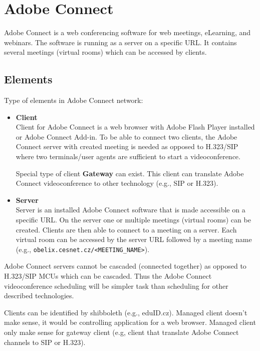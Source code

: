 \documentclass[a4paper]{report}
\begin{document}
\section{Adobe Connect}

Adobe Connect is a web conferencing software for web meetings, eLearning, and webinars. The software is running as a server on a specific URL. It contains several meetings (virtual rooms) which can be accessed by clients.

\subsection{Elements}

Type of elements in Adobe Connect network:

\begin{itemize}
\item \textbf{Client} \\
Client for Adobe Connect is a web browser with Adobe Flash Player installed or Adobe Connect Add-in. To be able to connect two clients, the Adobe Connect server with created meeting is needed as opposed to H.323/SIP  where two terminals/user agents are sufficient to start a videoconference.

Special type of client \textbf{Gateway} can exist. This client can translate Adobe Connect videoconference to other technology (e.g., SIP or H.323).

\item \textbf{Server} \\
Server is an installed Adobe Connect software that is made accessible on a specific URL. On the server one or multiple meetings (virtual rooms) can be created. Clients are then able to connect to a meeting on a server. Each virtual room can be accessed by the server URL followed by a meeting name (e.g., \verb|obelix.cesnet.cz/<MEETING_NAME>|).
\end{itemize}

Adobe Connect servers cannot be cascaded (connected together) as opposed to H.323/SIP MCUs which can be cascaded. Thus the Adobe Connect videoconference scheduling will be simpler task than scheduling for other described technologies.

Clients can be identified by shibboleth (e.g., eduID.cz). Managed client doesn't make sense, it would be controlling application for a web browser. Managed client only make sense for gateway client (e.g, client that translate Adobe Connect channels to SIP or H.323).
\end{document}
